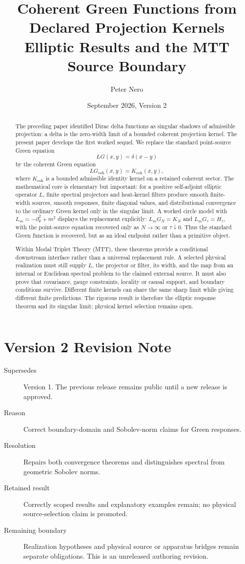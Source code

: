 \documentclass[11pt]{article}
\title{Coherent Green Functions from Declared Projection Kernels\\
\large Elliptic Results and the MTT Source Boundary}
\author{Peter Nero}
\date{September 2026, Version 2}
\begin{document}
\maketitle
\seriestagline

\begin{abstract}
The preceding paper identified Dirac delta functions as singular shadows of admissible projection: a delta is the zero-width limit of a bounded coherent projection kernel. The present paper develops the first worked sequel. We replace the standard point-source Green equation
\[
LG(x,y)=\delta(x-y)
\]
by the coherent Green equation
\[
LG_{\mathrm{coh}}(x,y)=K_{\mathrm{coh}}(x,y),
\]
where \(K_{\mathrm{coh}}\) is a bounded admissible identity kernel on a retained coherent sector. The mathematical core is elementary but important: for a positive self-adjoint elliptic operator \(L\), finite spectral projectors and heat-kernel filters produce smooth finite-width sources, smooth responses, finite diagonal values, and distributional convergence to the ordinary Green kernel only in the singular limit. A worked circle model with \(L_m=-\partial_\theta^2+m^2\) displays the replacement explicitly: \(L_mG_N=K_N\) and \(L_mG_\tau=H_\tau\), with the point-source equation recovered only as \(N\to\infty\) or \(\tau\downarrow0\). Thus the standard Green function is recovered, but as an ideal endpoint rather than a primitive object.

Within Modal Triplet Theory (MTT), these theorems provide a conditional
downstream interface rather than a universal replacement rule.  A selected
physical realization must still supply \(L\), the projector or filter, its
width, and the map from an internal or Euclidean spectral problem to the
claimed external source.  It must also prove that covariance, gauge
constraints, locality or causal support, and boundary conditions survive.
Different finite kernels can share the same sharp limit while giving
different finite predictions.  The rigorous result is therefore the
elliptic response theorem and its singular limit; physical kernel selection
remains open.
\end{abstract}

\section*{Version 2 Revision Note}
\begin{description}
\item[Supersedes] Version 1. The previous release remains public until a new release is approved.
\item[Reason] Correct boundary-domain and Sobolev-norm claims for Green responses.
\item[Resolution] Repairs both convergence theorems and distinguishes spectral from geometric Sobolev norms.
\item[Retained result] Correctly scoped results and explanatory examples remain; no physical source-selection claim is promoted.
\item[Remaining boundary] Realization hypotheses and physical source or apparatus bridges remain separate obligations. This is an unreleased authoring revision.
\end{description}
\end{document}
